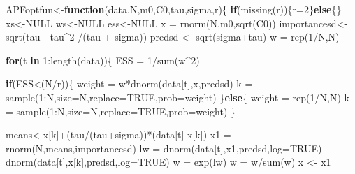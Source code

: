 \documentclass[
]{book}
\newenvironment{Shaded}{\begin{snugshade}}{\end{snugshade}}
\newcommand{\AttributeTok}[1]{\textcolor[rgb]{0.77,0.63,0.00}{#1}}
\newcommand{\ConstantTok}[1]{\textcolor[rgb]{0.00,0.00,0.00}{#1}}
\newcommand{\ControlFlowTok}[1]{\textcolor[rgb]{0.13,0.29,0.53}{\textbf{#1}}}
\newcommand{\DecValTok}[1]{\textcolor[rgb]{0.00,0.00,0.81}{#1}}
\newcommand{\FunctionTok}[1]{\textcolor[rgb]{0.00,0.00,0.00}{#1}}
\newcommand{\NormalTok}[1]{#1}
\newcommand{\OtherTok}[1]{\textcolor[rgb]{0.56,0.35,0.01}{#1}}
\newcommand{\SpecialCharTok}[1]{\textcolor[rgb]{0.00,0.00,0.00}{#1}}
\theoremstyle{break}
\theoremstyle{nonumberplain}
\begin{document}
\begin{Shaded}
\begin{Highlighting}[]
\NormalTok{APFoptfun}\OtherTok{\textless{}{-}}\ControlFlowTok{function}\NormalTok{(data,N,m0,C0,tau,sigma,r)\{}
  \ControlFlowTok{if}\NormalTok{(}\FunctionTok{missing}\NormalTok{(r))\{r}\OtherTok{=}\DecValTok{2}\NormalTok{\}}\ControlFlowTok{else}\NormalTok{\{\}}
\NormalTok{  xs}\OtherTok{\textless{}{-}}\ConstantTok{NULL}
\NormalTok{  ws}\OtherTok{\textless{}{-}}\ConstantTok{NULL}
\NormalTok{  ess}\OtherTok{\textless{}{-}}\ConstantTok{NULL}
\NormalTok{  x  }\OtherTok{=} \FunctionTok{rnorm}\NormalTok{(N,m0,}\FunctionTok{sqrt}\NormalTok{(C0))}
\NormalTok{  importancesd}\OtherTok{\textless{}{-}}\FunctionTok{sqrt}\NormalTok{(tau }\SpecialCharTok{{-}}\NormalTok{ tau}\SpecialCharTok{\^{}}\DecValTok{2} \SpecialCharTok{/}\NormalTok{(tau }\SpecialCharTok{+}\NormalTok{ sigma))}
\NormalTok{  predsd }\OtherTok{\textless{}{-}} \FunctionTok{sqrt}\NormalTok{(sigma}\SpecialCharTok{+}\NormalTok{tau)}
\NormalTok{  w  }\OtherTok{=} \FunctionTok{rep}\NormalTok{(}\DecValTok{1}\SpecialCharTok{/}\NormalTok{N,N)}
  
  \ControlFlowTok{for}\NormalTok{(t }\ControlFlowTok{in} \DecValTok{1}\SpecialCharTok{:}\FunctionTok{length}\NormalTok{(data))\{}
\NormalTok{    ESS  }\OtherTok{=} \DecValTok{1}\SpecialCharTok{/}\FunctionTok{sum}\NormalTok{(w}\SpecialCharTok{\^{}}\DecValTok{2}\NormalTok{)}
    
    \ControlFlowTok{if}\NormalTok{(ESS}\SpecialCharTok{\textless{}}\NormalTok{(N}\SpecialCharTok{/}\NormalTok{r))\{}
\NormalTok{    weight }\OtherTok{=}\NormalTok{ w}\SpecialCharTok{*}\FunctionTok{dnorm}\NormalTok{(data[t],x,predsd)}
\NormalTok{    k   }\OtherTok{=} \FunctionTok{sample}\NormalTok{(}\DecValTok{1}\SpecialCharTok{:}\NormalTok{N,}\AttributeTok{size=}\NormalTok{N,}\AttributeTok{replace=}\ConstantTok{TRUE}\NormalTok{,}\AttributeTok{prob=}\NormalTok{weight)}
\NormalTok{    \}}\ControlFlowTok{else}\NormalTok{\{}
\NormalTok{    weight }\OtherTok{=} \FunctionTok{rep}\NormalTok{(}\DecValTok{1}\SpecialCharTok{/}\NormalTok{N,N)}
\NormalTok{    k   }\OtherTok{=} \FunctionTok{sample}\NormalTok{(}\DecValTok{1}\SpecialCharTok{:}\NormalTok{N,}\AttributeTok{size=}\NormalTok{N,}\AttributeTok{replace=}\ConstantTok{TRUE}\NormalTok{,}\AttributeTok{prob=}\NormalTok{weight)}
\NormalTok{    \}}
    
\NormalTok{    means}\OtherTok{\textless{}{-}}\NormalTok{x[k]}\SpecialCharTok{+}\NormalTok{(tau}\SpecialCharTok{/}\NormalTok{(tau}\SpecialCharTok{+}\NormalTok{sigma))}\SpecialCharTok{*}\NormalTok{(data[t]}\SpecialCharTok{{-}}\NormalTok{x[k])}
\NormalTok{    x1   }\OtherTok{=} \FunctionTok{rnorm}\NormalTok{(N,means,importancesd)}
\NormalTok{    lw  }\OtherTok{=} \FunctionTok{dnorm}\NormalTok{(data[t],x1,predsd,}\AttributeTok{log=}\ConstantTok{TRUE}\NormalTok{)}\SpecialCharTok{{-}}\FunctionTok{dnorm}\NormalTok{(data[t],x[k],predsd,}\AttributeTok{log=}\ConstantTok{TRUE}\NormalTok{)}
\NormalTok{    w   }\OtherTok{=} \FunctionTok{exp}\NormalTok{(lw)}
\NormalTok{    w   }\OtherTok{=}\NormalTok{ w}\SpecialCharTok{/}\FunctionTok{sum}\NormalTok{(w)}
\NormalTok{    x }\OtherTok{\textless{}{-}}\NormalTok{ x1}
   

\end{Highlighting}
\end{Shaded}
\end{document}
